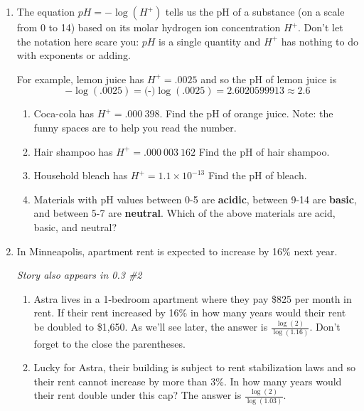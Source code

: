\begin{enumerate}
\newpage %

\item The equation $pH = -\log(H^+)$ tells us the pH of a substance (on a scale from 0 to 14) based on its molar hydrogen ion concentration $H^+$.  Don't let the notation here scare you: $pH$ is a single quantity and $H^+$ has nothing to do with exponents or adding. 

For example, lemon juice has $H^+= .0025$ and so the pH of lemon juice is 
$$-\log(.0025) = \text{(-)} \log(.0025) = 2.6020599913 \approx 2.6$$

\begin{enumerate}
\item Coca-cola has $H^+= .000~398$.  Find the pH of orange juice. Note: the funny spaces are to help you read the number.\vfill
\item Hair shampoo has $H^+= .000~003~162$  Find the pH of hair shampoo. \vfill
\item Household bleach has $H^+=1.1 \times 10^{-13}$  Find the pH of bleach. \vfill
\item Materials with pH values between 0-5 are \textbf{acidic}, between 9-14 are \textbf{basic}, and between 5-7 are \textbf{neutral}.  Which of the above materials are acid, basic, and neutral?  \vfill
 \end{enumerate}
 

\item In Minneapolis, apartment rent is expected to increase by 16\% next year.  \

\hfill \emph{Story also appears in 0.3 \#2}
\begin{enumerate}
\item Astra lives in a 1-bedroom apartment where they pay \$825 per month in rent.  If their rent increased by 16\% in how many years would their rent be doubled to \$1,650.  As we'll see later, the answer is $\displaystyle \frac{\log(2)}{\log(1.16)}$.  Don't forget to the close the parentheses.  
\vfill
\item Lucky for Astra, their building is subject to rent stabilization laws and so their rent cannot increase by more than 3\%. In how many years would their rent double under this cap?  The answer is $\displaystyle \frac{\log(2)}{\log(1.03)}$.\vfill
\end{enumerate}



\end{enumerate}


\newpage %

